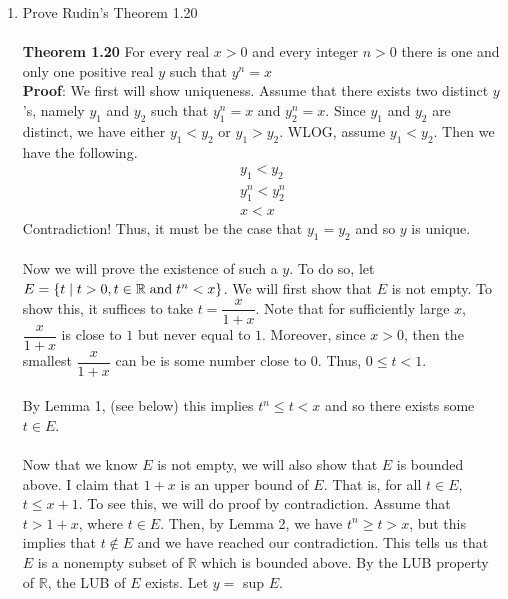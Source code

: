 \documentclass[12pt]{article}
\begin{document}
\problem 
\begin{enumerate}


\item Prove Rudin's Theorem 1.20 \\ \\


\textbf{Theorem 1.20} For every real $x>0$ and every integer $n>0$ there is one and only one positive real $y$ such that $y^{n}=x$ \\ 
  
\textbf{Proof}: We first will show uniqueness. Assume that there exists two distinct $y$'s, namely $y_{1}$ and $y_{2}$ such that $y_{1} ^{n} = x$ and $y_{2} ^{n} = x$. Since  $y_{1}$ and $y_{2}$ are distinct, we have either $y_{1} < y_{2}$ or $y_{1} > y_{2}$. WLOG, assume $y_{1} < y_{2}$. Then we have the following. \begin{align*}
y_{1} < y_{2} \\
y_{1} ^{n} < y_{2} ^{n} \\
x < x
\end{align*}
Contradiction! Thus, it must be the case that $y_{1}=y_{2}$ and so $y$ is unique. \\ \\


Now we will prove the existence of such a $y$. To do so, let $E = \left\{t \; |\; t>0, t \in \mathbb{R} \; \text{and} \; t^{n}<x\right\}$. We will first show that $E$ is not empty. To show this, it suffices to take $t=\dfrac{x}{1+x}$. Note that for sufficiently large $x$, $\dfrac{x}{1+x}$ is close to $1$ but never equal to $1$. Moreover, since $x>0$, then the smallest $\dfrac{x}{1+x}$ can be is some number close to $0$. Thus, $0 \leq t < 1$. \\ \\ By Lemma 1, (see below) this implies $t^{n} \leq t < x$ and so there exists some $t \in E$. \\ \\ Now that we know $E$ is not empty, we will also show that $E$ is bounded above. I claim that $1+x$ is an upper bound of $E$. That is, for all $t \in E$, $t \leq x+1$. To see this, we will do proof by contradiction. Assume that $t > 1+x$, where $t \in E$. Then, by Lemma 2, we have $t^{n} \geq t > x$, but this implies that $t \notin E$ and we have reached our contradiction. This tells us that $E$ is a nonempty subset of $\mathbb{R}$ which is bounded above. By the LUB property of $\mathbb{R}$, the LUB of $E$ exists. Let $y=$ sup $E$.\\ \\



\end{enumerate}
\end{document}
